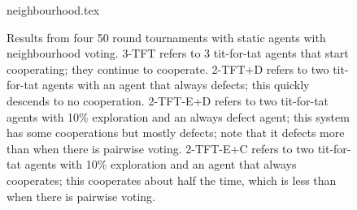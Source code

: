 \begin{figure}
\begin{center}
 {neighbourhood.tex} 
\end {center}
\caption{Results from four 50 round tournaments with static agents
  with neighbourhood voting.  3-TFT refers to 3 tit-for-tat agents
  that start cooperating; they continue to cooperate.  2-TFT+D refers
  to two tit-for-tat agents with an agent that always defects; this
  quickly descends to no cooperation.  2-TFT-E+D refers to two
  tit-for-tat agents with 10\% exploration and an always defect agent;
  this system has some cooperations but mostly defects; note that it
  defects more than when there is pairwise voting.  2-TFT-E+C refers
  to two tit-for-tat agents with 10\% exploration and an agent that
  always cooperates; this cooperates about half the time, which is
  less than when there is pairwise voting.}
  \label{figStaticOneVote}
\end {figure}
